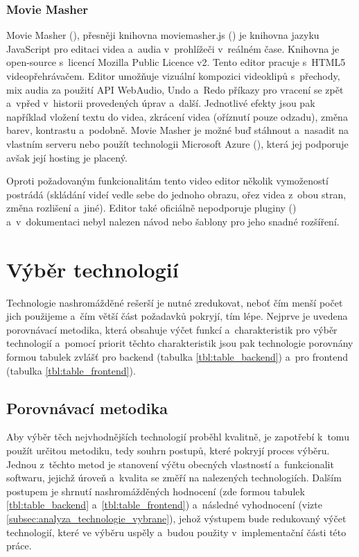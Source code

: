 \documentclass[thesis=M,czech]{FITthesis}[2012/06/26]
\begin{document}
\subsubsection{Movie Masher} \label{subsubsec:analyza_reseni_mm}
Movie Masher (\cite{mm}), přesněji knihovna moviemasher.js (\cite{mm_js}) je knihovna jazyku JavaScript pro editaci videa a~audia v~prohlížeči v~reálném čase. Knihovna je open-source s~licencí Mozilla Public Licence v2. Tento editor pracuje s~HTML5 videopřehrávačem. Editor umožňuje vizuální kompozici videoklipů s~přechody, mix audia za použití API WebAudio, Undo a~Redo příkazy pro vracení se zpět a~vpřed v~historii provedených úprav a~další. Jednotlivé efekty jsou pak například vložení textu do videa, zkrácení videa (oříznutí pouze odzadu), změna barev, kontrastu a~podobně. Movie Masher je možné buď stáhnout a~nasadit na vlastním serveru nebo použít technologii Microsoft Azure (\cite{mm_azure}), která jej podporuje avšak její hosting je placený.
	
	Oproti požadovaným funkcionalitám tento video editor několik vymožeností postrádá (skládání videí vedle sebe do jednoho obrazu, ořez videa z~obou stran, změna rozlišení a~jiné). Editor také oficiálně nepodporuje pluginy (\cite{mm_azure}) a~v~dokumentaci nebyl nalezen návod nebo šablony pro jeho snadné rozšíření. 



\section{Výběr technologií} \label{sec:analyza_technologie}
Technologie nashromážděné rešerší je nutné zredukovat, neboť čím menší počet jich použijeme a~čím větší část požadavků pokryjí, tím lépe. Nejprve je uvedena porovnávací metodika, která obsahuje výčet funkcí a~charakteristik pro výběr technologií a~pomocí priorit těchto charakteristik jsou pak technologie porovnány formou tabulek zvlášť pro backend (tabulka \ref{tbl:table_backend}) a~pro frontend (tabulka \ref{tbl:table_frontend}).

\subsection{Porovnávací metodika} \label{subsec:analyza_technologie_metodika}
Aby výběr těch nejvhodnějších technologií proběhl kvalitně, je zapotřebí k~tomu použít určitou metodiku, tedy souhrn postupů, které pokryjí proces výběru. Jednou z~těchto metod je stanovení výčtu obecných vlastností a~funkcionalit softwaru, jejichž úroveň a~kvalita se změří na nalezených technologiích. Dalším postupem je shrnutí nashromážděných hodnocení (zde formou tabulek \ref{tbl:table_backend} a~\ref{tbl:table_frontend}) a~následné vyhodnocení (vizte \ref{subsec:analyza_technologie_vybrane}), jehož výstupem bude redukovaný výčet technologií, které ve výběru uspěly a~budou použity v~implementační části této práce.
	
\end{document}
